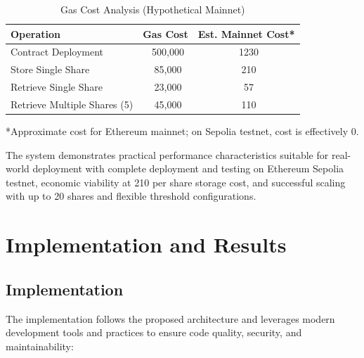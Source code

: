 \documentclass[12pt,a4paper]{article}
\newcommand{\rupee}{\text{Rs.}}  %
\begin{document}
\begin{table}[H]
\centering
\caption{Gas Cost Analysis (Hypothetical Mainnet)}
\label{tab:gas_analysis}
\begin{tabular}{@{}lcc@{}}
\toprule
\textbf{Operation} & \textbf{Gas Cost} & \textbf{Est. Mainnet Cost*} \\
\midrule
Contract Deployment & ~500{,}000 & ~\rupee1230 \\
Store Single Share & ~85{,}000 & ~\rupee210 \\
Retrieve Single Share & ~23{,}000 & ~\rupee57 \\
Retrieve Multiple Shares (5) & ~45{,}000 & ~\rupee110 \\
\bottomrule
\end{tabular}
\footnotesize{*Approximate cost for Ethereum mainnet; on Sepolia testnet, cost is effectively 0.}
\end{table}

The system demonstrates practical performance characteristics suitable for real-world deployment with complete deployment and testing on Ethereum Sepolia testnet, economic viability at \rupee210 per share storage cost, and successful scaling with up to 20 shares and flexible threshold configurations.
\clearpage
\section{Implementation and Results}
\subsection{Implementation}

The implementation follows the proposed architecture and leverages modern development tools and practices to ensure code quality, security, and maintainability:
\end{document}
